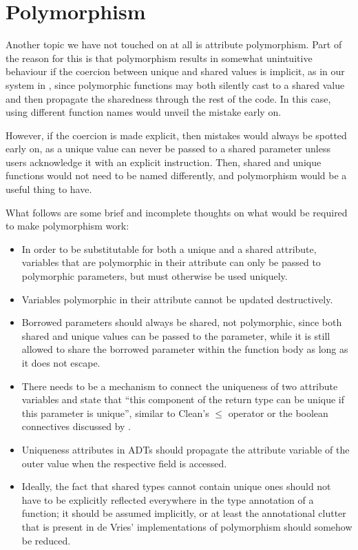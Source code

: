 \section{Polymorphism}
Another topic we have not touched on at all is attribute polymorphism. Part of the reason for this is that polymorphism results in somewhat unintuitive behaviour if the coercion between unique and shared values is implicit, as in our system in , since polymorphic functions may both silently cast to a shared value and then propagate the sharedness through the rest of the code. In this case, using different function names would unveil the mistake early on.

However, if the coercion is made explicit, then mistakes would always be spotted early on, as a unique value can never be passed to a shared parameter unless users acknowledge it with an explicit instruction. Then, shared and unique functions would not need to be named differently, and polymorphism would be a useful thing to have.

What follows are some brief and incomplete thoughts on what would be required to make polymorphism work:
\begin{itemize}
	\item In order to be substitutable for both a unique and a shared attribute, variables that are polymorphic in their attribute can only be passed to polymorphic parameters, but must otherwise be used uniquely.
	\item Variables polymorphic in their attribute cannot be updated destructively.
	\item Borrowed parameters should always be shared, not polymorphic, since both shared and unique values can be passed to the parameter, while it is still allowed to share the borrowed parameter within the function body as long as it does not escape.
	\item There needs to be a mechanism to connect the uniqueness of two attribute variables and state that ``this component of the return type can be unique if this parameter is unique'', similar to Clean's $\leq$ operator or the boolean connectives discussed by \cite{de_vries_making_2009}.
	\item Uniqueness attributes in ADTs should propagate the attribute variable of the outer value when the respective field is accessed.
	\item Ideally, the fact that shared types cannot contain unique ones should not have to be explicitly reflected everywhere in the type annotation of a function; it should be assumed implicitly, or at least the annotational clutter that is present in de Vries' implementations of polymorphism should somehow be reduced.
\end{itemize}

